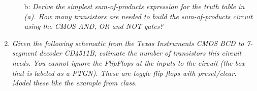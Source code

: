 \documentclass[12pt]{article}
\begin{document}
\begin{enumerate}
\begin{enumerate}
    \item[b:] \textit{Derive the simplest sum-of-products expression for the truth table in (a). How many transistors are needed to build the sum-of-products circuit using the CMOS AND, OR and NOT gates?}

  \end{enumerate}

  \newpage
  \item \textit{Given the following schematic from the Texas Instruments CMOS BCD to 7-segment decoder CD4511B, estimate the number of transistors this circuit needs. You cannot ignore the FlipFlops at the inputs to the circuit (the box that is labeled as a PTGN). These are toggle flip flops with preset/clear. Model these like the example from class.}

  

\end{enumerate}
\end{document}

